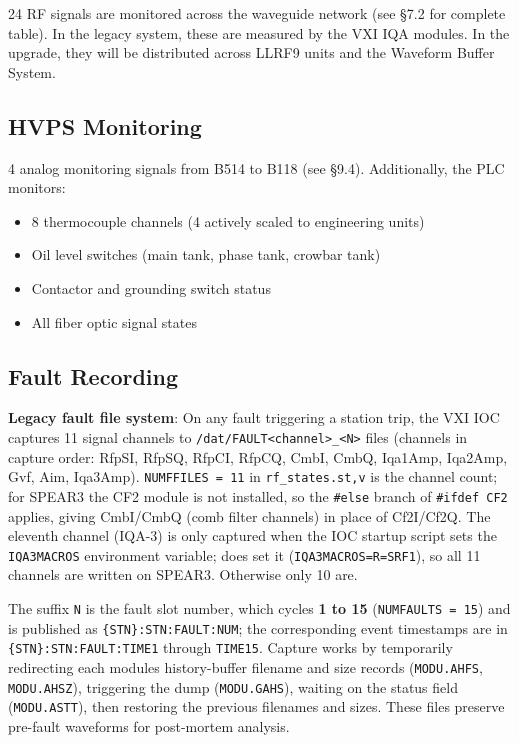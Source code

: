 24 RF signals are monitored across the waveguide network (see §7.2 for complete table). In the legacy system, these are measured by the VXI IQA modules. In the upgrade, they will be distributed across LLRF9 units and the Waveform Buffer System.

\subsection{HVPS Monitoring}

4 analog monitoring signals from B514 to B118 (see §9.4). Additionally, the PLC monitors:

\begin{itemize}
\tightlist
\item
  8 thermocouple channels (4 actively scaled to engineering units)
\item
  Oil level switches (main tank, phase tank, crowbar tank)
\item
  Contactor and grounding switch status
\item
  All fiber optic signal states
\end{itemize}

\subsection{Fault Recording}

\textbf{Legacy fault file system}: On any fault triggering a station trip, the VXI IOC captures 11 signal channels to \texttt{/dat/FAULT\textless{}channel\textgreater{}\_\textless{}N\textgreater{}} files (channels in capture order: RfpSI, RfpSQ, RfpCI, RfpCQ, CmbI, CmbQ, Iqa1Amp, Iqa2Amp, Gvf, Aim, Iqa3Amp). \texttt{NUMFFILES\ =\ 11} in \texttt{rf\_states.st,v} is the channel count; for SPEAR3 the CF2 module is not installed, so the \texttt{\#else} branch of \texttt{\#ifdef\ CF2} applies, giving CmbI/CmbQ (comb filter channels) in place of Cf2I/Cf2Q. The eleventh channel (IQA-3) is only captured when the IOC startup script sets the \texttt{IQA3MACROS} environment variable;  does set it (\texttt{IQA3MACROS=R=SRF1}), so all 11 channels are written on SPEAR3. Otherwise only 10 are.

The suffix \texttt{N} is the fault slot number, which cycles \textbf{1 to 15} (\texttt{NUMFAULTS\ =\ 15}) and is published as \texttt{\{STN\}:STN:FAULT:NUM}; the corresponding event timestamps are in \texttt{\{STN\}:STN:FAULT:TIME1} through \texttt{TIME15}. Capture works by temporarily redirecting each module\textquotesingle s history-buffer filename and size records (\texttt{MODU.AHFS}, \texttt{MODU.AHSZ}), triggering the dump (\texttt{MODU.GAHS}), waiting on the status field (\texttt{MODU.ASTT}), then restoring the previous filenames and sizes. These files preserve pre-fault waveforms for post-mortem analysis.

